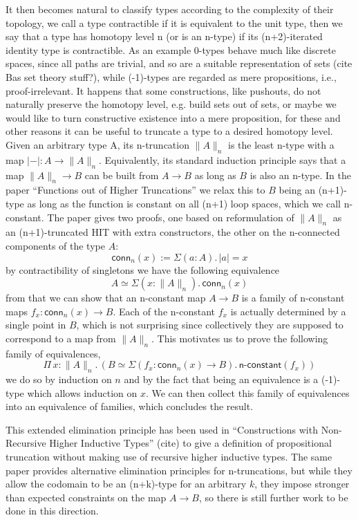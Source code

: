 \documentclass{book}
\newcommand{\tr}[2]{\| #2 \|_{#1}}
\newcommand{\trcon}[1]{| #1 |}
\newcommand{\conn}{\mathsf{conn}}
\newcommand{\sd}{.\,}
\begin{document}
It then becomes natural to classify types according to the complexity
of their topology, we call a type contractible if it is equivalent to
the unit type, then we say that a type has homotopy level n (or is an
n-type) if its (n+2)-iterated identity type is contractible. As an example
0-types behave much like discrete spaces, since all paths are trivial,
and so are a suitable representation of sets (cite Bas set theory stuff?),
while (-1)-types are regarded as mere propositions, i.e., proof-irrelevant.
It happens that some constructions, like pushouts, do not naturally
preserve the homotopy level, e.g. build sets out of sets, or maybe we
would like to turn constructive existence into a mere proposition, for
these and other reasons it can be useful to truncate a type to a
desired homotopy level.
Given an arbitrary type A, its n-truncation $\tr{n}{A}$ is the least
n-type with a map $\trcon{-} : A \to \tr{n}{A}$.  Equivalently, its standard
induction principle says that a map $\tr{n}{A} \to B$ can be built
from $A \to B$ as long as $B$ is also an n-type.
In the paper ``Functions out of Higher Truncations'' we relax this to
$B$ being an (n+1)-type as long as the function is constant on all
(n+1) loop spaces, which we call n-constant.
The paper gives two proofs, one based on reformulation of $\tr{n}{A}$
as an (n+1)-truncated HIT with extra constructors, the other on the
n-connected components of the type $A$:
\[
\conn_n(x) := \Sigma (a : A)\sd \trcon{a} = x
\]
by contractibility of singletons we have the following equivalence
\[
A \simeq \Sigma (x : \tr{n}{A})\sd \conn_n(x)
\]
from that we can show that an n-constant map $A \to B$ is a family of n-constant
maps $f_x : \conn_n(x) \to B$. Each of the n-constant $f_x$ is actually
determined by a single point in $B$, which is not surprising since
collectively they are supposed to correspond to a map from
$\tr{n}{A}$. This motivates us to prove the following family of equivalences,
\[
\Pi\,x : \tr{n}{A}\sd (B \simeq \Sigma (f_x : \conn_n(x) \to B)\sd\textsf{n-constant}(f_x))
\]
we do so by induction on $n$ and by the fact that being an equivalence is a
(-1)-type which allows induction on $x$. We can then collect this
family of equivalences into an equivalence of families, which
concludes the result.

This extended elimination principle has been used in ``Constructions
with Non-Recursive Higher Inductive Types'' (cite) to give a
definition of propositional truncation without making use of recursive
higher inductive types. The same paper provides alternative
elimination principles for n-truncations, but while they allow the
codomain to be an (n+k)-type for an arbitrary $k$, they impose
stronger than expected constraints on the map $A \to B$, so there is
still further work to be done in this direction.
\end{document}

